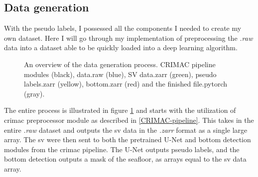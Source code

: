         
    \subsection{Data generation}
        With the pseudo labels, I possessed all the components I needed to create my own dataset. Here I will go through my implementation of preprocessing the \textit{.raw} data into a dataset able to be quickly loaded into a deep learning algorithm.
        
        \begin{figure}[H]
            \centering
            
            \caption[Data generation process]{An overview of the data generation process. CRIMAC pipeline modules (black), data.raw (blue), SV data.zarr (green), pseudo labels.zarr (yellow), bottom.zarr (red) and the finished file.pytorch (gray).}
          	\medskip 
            \label{data_generation_flowchart_fig}
        \end{figure}
        
        The entire process is illustrated in figure \ref{data_generation_flowchart_fig} and starts with the utilization of \gls{crimac} preprocessor module as described in \ref{CRIMAC-pipeline}. This takes in the entire \textit{.raw} dataset and outputs the \gls{sv} data in the \textit{.zarr} format as a single large array. The \gls{sv} were then sent to both the pretrained U-Net and bottom detection modules from the \gls{crimac} pipeline. The U-Net outputs pseudo labels, and the bottom detection outputs a mask of the seafloor, as arrays equal to the \gls{sv} data array.
        
